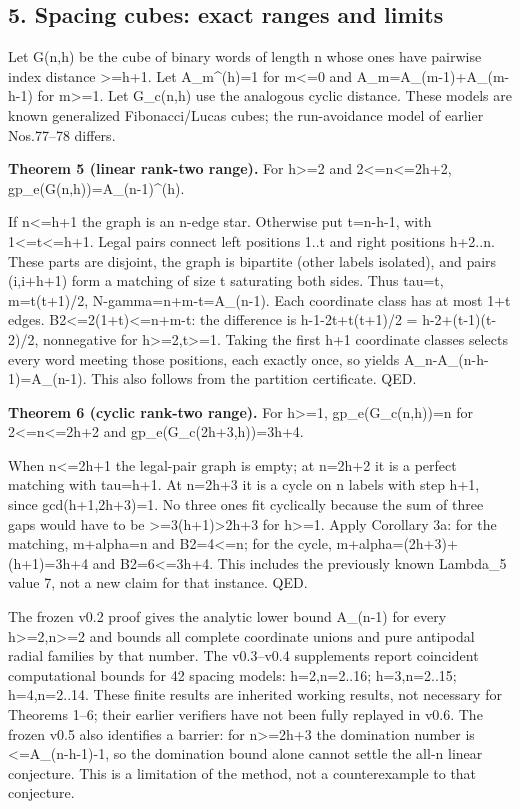 \documentclass[
]{article}
\begin{document}
\subsection{5. Spacing cubes: exact ranges and
limits}\label{spacing-cubes-exact-ranges-and-limits}

Let G(n,h) be the cube of binary words of length n whose ones have
pairwise index distance \textgreater=h+1. Let A\_m\^{}(h)=1 for
m\textless=0 and A\_m=A\_(m-1)+A\_(m-h-1) for m\textgreater=1. Let
G\_c(n,h) use the analogous cyclic distance. These models are known
generalized Fibonacci/Lucas cubes; the run-avoidance model of earlier
Nos.77--78 differs.

\textbf{Theorem 5 (linear rank-two range).} For h\textgreater=2 and
2\textless=n\textless=2h+2, gp\_e(G(n,h))=A\_(n-1)\^{}(h).

If n\textless=h+1 the graph is an n-edge star. Otherwise put t=n-h-1,
with 1\textless=t\textless=h+1. Legal pairs connect left positions 1..t
and right positions h+2..n. These parts are disjoint, the graph is
bipartite (other labels isolated), and pairs (i,i+h+1) form a matching
of size t saturating both sides. Thus tau=t, m=t(t+1)/2,
N-gamma=n+m-t=A\_(n-1). Each coordinate class has at most 1+t edges.
B2\textless=2(1+t)\textless=n+m-t: the difference is h-1-2t+t(t+1)/2 =
h-2+(t-1)(t-2)/2, nonnegative for h\textgreater=2,t\textgreater=1.
Taking the first h+1 coordinate classes selects every word meeting those
positions, each exactly once, so yields A\_n-A\_(n-h-1)=A\_(n-1). This
also follows from the partition certificate. QED.

\textbf{Theorem 6 (cyclic rank-two range).} For h\textgreater=1,
gp\_e(G\_c(n,h))=n for 2\textless=n\textless=2h+2 and
gp\_e(G\_c(2h+3,h))=3h+4.

When n\textless=2h+1 the legal-pair graph is empty; at n=2h+2 it is a
perfect matching with tau=h+1. At n=2h+3 it is a cycle on n labels with
step h+1, since gcd(h+1,2h+3)=1. No three ones fit cyclically because
the sum of three gaps would have to be
\textgreater=3(h+1)\textgreater2h+3 for h\textgreater=1. Apply Corollary
3a: for the matching, m+alpha=n and B2=4\textless=n; for the cycle,
m+alpha=(2h+3)+(h+1)=3h+4 and B2=6\textless=3h+4. This includes the
previously known Lambda\_5 value 7, not a new claim for that instance.
QED.

The frozen v0.2 proof gives the analytic lower bound A\_(n-1) for every
h\textgreater=2,n\textgreater=2 and bounds all complete coordinate
unions and pure antipodal radial families by that number. The v0.3--v0.4
supplements report coincident computational bounds for 42 spacing
models: h=2,n=2..16; h=3,n=2..15; h=4,n=2..14. These finite results are
inherited working results, not necessary for Theorems 1--6; their
earlier verifiers have not been fully replayed in v0.6. The frozen v0.5
also identifies a barrier: for n\textgreater=2h+3 the domination number
is \textless=A\_(n-h-1)-1, so the domination bound alone cannot settle
the all-n linear conjecture. This is a limitation of the method, not a
counterexample to that conjecture.
\end{document}
